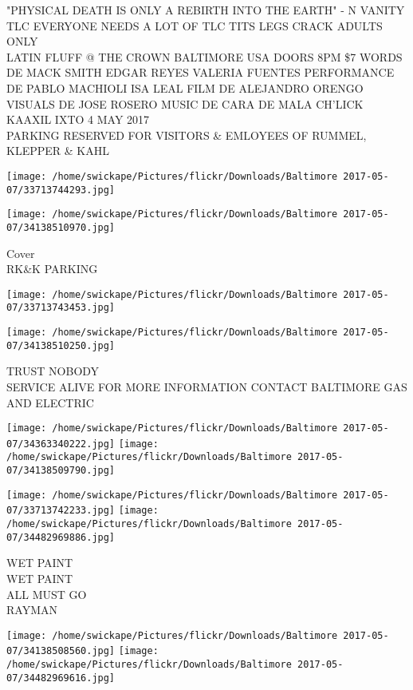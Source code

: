 \documentclass[10pt,letterpaper]{article}
\begin{document}
"PHYSICAL DEATH IS ONLY A REBIRTH INTO THE EARTH" {-} N VANITY\\
TLC EVERYONE NEEDS A LOT OF TLC TITS LEGS CRACK ADULTS ONLY\\
LATIN FLUFF @ THE CROWN BALTIMORE USA DOORS 8PM \$7 WORDS DE MACK SMITH EDGAR REYES VALERIA FUENTES PERFORMANCE DE PABLO MACHIOLI ISA LEAL FILM DE ALEJANDRO ORENGO VISUALS DE JOSE ROSERO MUSIC DE CARA DE MALA CH'LICK KAAXIL IXTO 4 MAY 2017\\
PARKING RESERVED FOR VISITORS \& EMLOYEES OF RUMMEL, KLEPPER \& KAHL
\pagebreak

\texttt{[image: /home/swickape/Pictures/flickr/Downloads/Baltimore 2017-05-07/33713744293.jpg]}

\vspace{0.25in}
\texttt{[image: /home/swickape/Pictures/flickr/Downloads/Baltimore 2017-05-07/34138510970.jpg]}

Cover\\
RK\&K PARKING
\pagebreak

\texttt{[image: /home/swickape/Pictures/flickr/Downloads/Baltimore 2017-05-07/33713743453.jpg]}

\vspace{0.25in}
\texttt{[image: /home/swickape/Pictures/flickr/Downloads/Baltimore 2017-05-07/34138510250.jpg]}

TRUST NOBODY\\
SERVICE ALIVE FOR MORE INFORMATION CONTACT BALTIMORE GAS AND ELECTRIC
\pagebreak

\texttt{[image: /home/swickape/Pictures/flickr/Downloads/Baltimore 2017-05-07/34363340222.jpg]}
\texttt{[image: /home/swickape/Pictures/flickr/Downloads/Baltimore 2017-05-07/34138509790.jpg]}

\texttt{[image: /home/swickape/Pictures/flickr/Downloads/Baltimore 2017-05-07/33713742233.jpg]}
\texttt{[image: /home/swickape/Pictures/flickr/Downloads/Baltimore 2017-05-07/34482969886.jpg]}

WET PAINT\\
WET PAINT\\
ALL MUST GO\\
RAYMAN
\pagebreak

\texttt{[image: /home/swickape/Pictures/flickr/Downloads/Baltimore 2017-05-07/34138508560.jpg]}
\texttt{[image: /home/swickape/Pictures/flickr/Downloads/Baltimore 2017-05-07/34482969616.jpg]}
\end{document}
